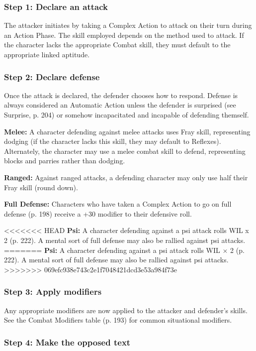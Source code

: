 \subsubsection{Step 1: Declare an attack}

The attacker initiates by taking a Complex Action to attack on their turn during an Action Phase. The skill employed depends on the method used to attack. If the character lacks the appropriate Combat skill, they must default to the appropriate linked aptitude.

\subsubsection{Step 2: Declare defense}

Once the attack is declared, the defender chooses how to respond. Defense is always considered an Automatic Action unless the defender is surprised (see Surprise, p. 204) or somehow incapacitated and incapable of defending themself.

\textbf{Melee:} A character defending against melee attacks uses Fray skill, representing dodging (if the character lacks this skill, they may default to Reflexes). Alternately, the character may use a melee combat skill to defend, representing blocks and parries rather than dodging.

\textbf{Ranged:} Against ranged attacks, a defending character may only use half their Fray skill (round down).

\textbf{Full Defense:} Characters who have taken a Complex Action to go on full defense (p. 198) receive a +30 modifier to their defensive roll.

<<<<<<< HEAD
\textbf{Psi:} A character defending against a psi attack rolls WIL x 2 (p. 222). A mental sort of full defense may also be rallied against psi attacks.
=======
\textbf{Psi:} A character defending against a psi attack rolls WIL $\times$ 2 (p. 222). A mental sort of full defense may also be rallied against psi attacks.
>>>>>>> 069efc938e743c2e1f7048421dcd3e53a984f73e

\subsubsection{Step 3: Apply modifiers}

Any appropriate modifiers are now applied to the attacker and defender’s skills. See the Combat Modifiers table (p. 193) for common situational modifiers.

\subsubsection{Step 4: Make the opposed text}

